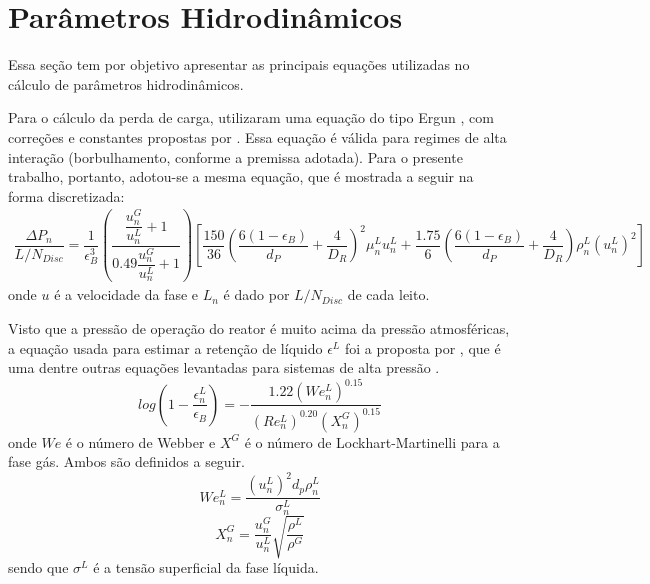 
\section{Parâmetros Hidrodinâmicos} \label{sec:hidrodinamica3}

Essa seção tem por objetivo apresentar as principais equações utilizadas no
cálculo de parâmetros hidrodinâmicos.

Para o cálculo da perda de carga,  utilizaram uma equação
do tipo Ergun , com correções e constantes propostas
por . Essa equação é válida para regimes de alta
interação (borbulhamento, conforme a premissa adotada). Para o presente
trabalho, portanto, adotou-se a mesma equação, que é mostrada a seguir na forma
discretizada:
\begin{equation}
\label{eq:deltaP}
\begin{split}
\dfrac{\Delta P_{n}}{L/N_{Disc}} = \dfrac{1}{\epsilon_B^{3}}
\left(\dfrac{\dfrac{u^{G}_{n}}{u^{L}_{n}} +
1}{\num{0,49}\dfrac{u^{G}_{n}}{u^{L}_{n}} + 1}\right)
\left[\dfrac{150}{36}\left(\dfrac{6(1-\epsilon_B)} {d_P}+\dfrac{4}{D_R}
\right)^2\mu^{L}_{n}u^{L}_{n} + \dfrac{\num{1,75}}{6}
\left(\dfrac{6(1-\epsilon_B)} {d_P} + \dfrac{4}{D_R}\right)
\rho^{L}_{n}(u^{L}_{n})^2 \right]
\end{split}
\end{equation}
onde $u$ é a velocidade da fase e $L_n$ é dado por $L/N_{Disc}$ de cada leito.


Visto que a pressão de operação do reator é muito acima da pressão atmosféricas,
a equação usada para estimar a retenção de líquido $\epsilon^L$ foi a proposta
por , que é uma dentre outras
equações levantadas para sistemas de alta pressão \cite{Ancheyta2011}.
\begin{equation}
log \left (1-\dfrac{\epsilon_{n}^L}{\epsilon_B} \right) =
-\dfrac{\num{1,22}(We_{n}^L)^{\num{0,15}}}{(Re_{n}^L)^{\num{0,20}}(X_{n}^G)^{\num{0,15}}}
\label{eq:epsilonL}
\end{equation}
onde $We$ é o número de Webber e $X^G$ é o número de Lockhart-Martinelli
para a fase gás. Ambos são definidos a seguir.
\begin{equation}
We_{n}^L = \dfrac{(u_{n}^L)^2d_p\rho_{n}^L}{\sigma_{n}^L}
\label{eq:webber}
\end{equation}
\begin{equation}
X_{n}^G = \dfrac{u_{n}^G}{u_n^L} \sqrt{\dfrac{\rho^L}{\rho^G}}
\label{eq:X}
\end{equation}
sendo que $\sigma^L$ é a tensão superficial da fase líquida.

